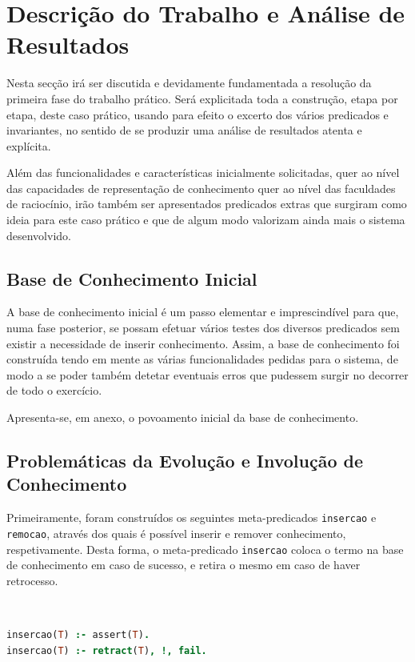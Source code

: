 \documentclass[a4paper, 11pt]{article}
\begin{document}
\pagebreak

\section{Descrição do Trabalho e Análise de Resultados}

Nesta secção irá ser discutida e devidamente fundamentada a resolução da primeira fase do trabalho prático. Será explicitada
toda a construção, etapa por etapa, deste caso prático, usando para efeito o excerto dos vários predicados e invariantes,
no sentido de se produzir uma análise de resultados atenta e explícita.

Além das funcionalidades e características inicialmente solicitadas, quer ao nível das capacidades de representação de
conhecimento quer ao nível das faculdades de raciocínio, irão também ser apresentados predicados extras que surgiram como
ideia para este caso prático e que de algum modo valorizam ainda mais o sistema desenvolvido.

\subsection{Base de Conhecimento Inicial}

A base de conhecimento inicial é um passo elementar e imprescindível para que, numa fase posterior, se possam efetuar vários
testes dos diversos predicados sem existir a necessidade de inserir conhecimento. Assim, a base de conhecimento foi construída
tendo em mente as várias funcionalidades pedidas para o sistema, de modo a se poder também detetar eventuais erros que
pudessem surgir no decorrer de todo o exercício.

Apresenta-se, em anexo, o povoamento inicial da base de conhecimento.

\subsection{Problemáticas da Evolução e Involução de Conhecimento}
\label{sec:evolucao}

Primeiramente, foram construídos os seguintes meta-predicados \texttt{insercao} e \texttt{remocao}, através dos quais é
possível inserir e remover conhecimento, respetivamente. Desta forma, o meta-predicado \texttt{insercao} coloca o termo
na base de conhecimento em caso de sucesso, e retira o mesmo em caso de haver retrocesso.

\

\begin{lstlisting}[language=Prolog, caption={Extensão do meta-predicado \texttt{insercao}}]
% Extensao do meta-predicado insercao: T -> {V, F}
insercao(T) :- assert(T).
insercao(T) :- retract(T), !, fail.
\end{lstlisting}
\end{document}
